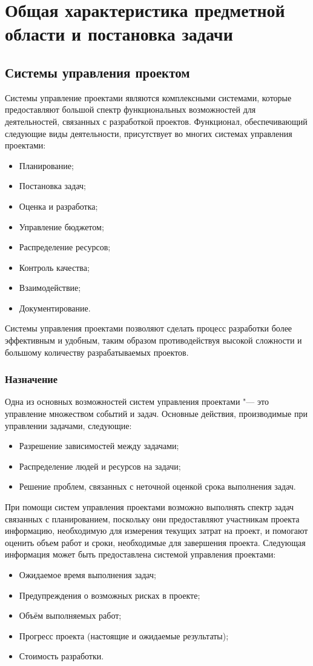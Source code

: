 \chapter{Общая характеристика предметной области и постановка задачи}
\section{Системы управления проектом}
Системы управление проектами являются комплексными системами, которые
предоставляют большой спектр функциональных возможностей для деятельностей,
связанных с разработкой проектов. Функционал, обеспечивающий следующие виды
деятельности, присутствует во многих системах управления проектами:
\begin{itemize}
  \item Планирование;
  \item Постановка задач;
  \item Оценка и разработка;
  \item Управление бюджетом;
  \item Распределение ресурсов;
  \item Контроль качества;
  \item Взаимодействие;
  \item Документирование.
\end{itemize}
Системы управления проектами позволяют сделать процесс разработки более
эффективным и удобным, таким образом противодействуя высокой сложности и
большому количеству разрабатываемых проектов. 

\subsection{Назначение}

Одна из основных возможностей систем управления проектами "--- это
управление множеством событий и задач. Основные действия, производимые
при управлении задачами, следующие:
\begin{itemize}
  \item Разрешение зависимостей между задачами;
  \item Распределение людей и ресурсов на задачи;
  \item Решение проблем, связанных с неточной оценкой срока выполнения задач.
\end{itemize}

При помощи систем управления проектами возможно выполнять спектр задач
связанных с планированием, поскольку они предоставляют участникам проекта
информацию, необходимую для измерения текущих затрат на проект, и помогают
оценить объем работ и сроки, необходимые для завершения проекта. Следующая
информация может быть предоставлена системой управления проектами:
\begin{itemize}
  \item Ожидаемое время выполнения задач;
  \item Предупреждения о возможных рисках в проекте;
  \item Объём выполняемых работ;
  \item Прогресс проекта (настоящие и ожидаемые результаты);
  \item Стоимость разработки.
\end{itemize}


